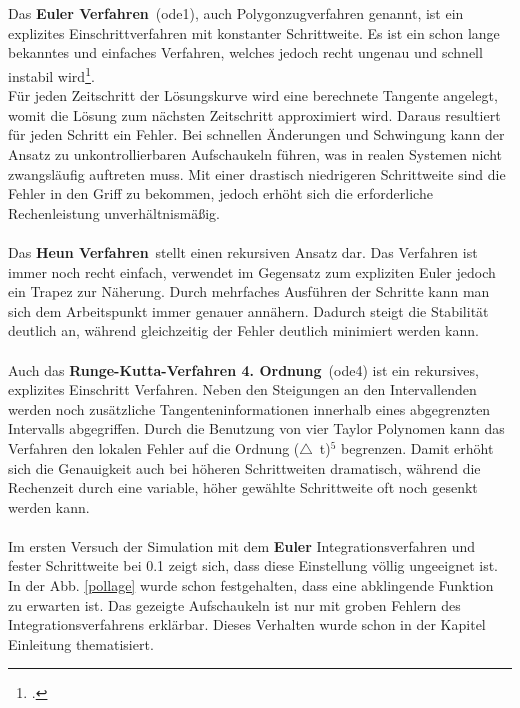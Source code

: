 \documentclass[12pt,a4paper]{scrartcl}	%
\begin{document}
\\
\\
Das \textbf{Euler Verfahren}~(ode1), auch Polygonzugverfahren genannt, ist ein explizites Einschrittverfahren mit konstanter Schrittweite. Es ist ein schon lange bekanntes und einfaches Verfahren, welches jedoch recht ungenau und schnell instabil wird\footcite[vgl.][S. 55 \psq]{simu}.\\
Für jeden Zeitschritt der Lösungskurve wird eine berechnete Tangente angelegt, womit die Lösung zum nächsten Zeitschritt approximiert wird. Daraus resultiert für jeden Schritt ein Fehler. Bei schnellen Änderungen und Schwingung kann der Ansatz zu unkontrollierbaren Aufschaukeln führen, was in realen Systemen nicht zwangsläufig auftreten muss. Mit einer drastisch niedrigeren Schrittweite sind die Fehler in den Griff zu bekommen, jedoch erhöht sich die erforderliche Rechenleistung unverhältnismäßig.\\
\\
Das \textbf{Heun Verfahren}~stellt einen rekursiven Ansatz dar. Das Verfahren ist immer noch recht einfach, verwendet im Gegensatz zum expliziten Euler jedoch ein Trapez zur Näherung. Durch mehrfaches Ausführen der Schritte kann man sich dem Arbeitspunkt immer genauer annähern. Dadurch steigt die Stabilität deutlich an, während gleichzeitig der Fehler deutlich minimiert werden kann.\\
\\
Auch das \textbf{Runge-Kutta-Verfahren 4. Ordnung}~(ode4) ist ein rekursives, explizites Einschritt Verfahren. Neben den Steigungen an den Intervallenden werden noch zusätzliche Tangenteninformationen innerhalb eines abgegrenzten Intervalls abgegriffen. Durch die Benutzung von vier Taylor Polynomen kann das Verfahren den lokalen Fehler auf die Ordnung ($\triangle$~t)$^{5}$ begrenzen. Damit erhöht sich die Genauigkeit auch bei höheren Schrittweiten dramatisch, während die Rechenzeit durch eine variable, höher gewählte Schrittweite oft noch gesenkt werden kann.\\
\\
Im ersten Versuch der Simulation mit dem \textbf{Euler} Integrationsverfahren und fester Schrittweite bei 0.1 zeigt sich, dass diese Einstellung völlig ungeeignet ist. In der Abb. \ref{pollage} wurde schon festgehalten, dass eine abklingende Funktion zu erwarten ist. Das gezeigte Aufschaukeln ist nur mit groben Fehlern des Integrationsverfahrens erklärbar. Dieses Verhalten wurde schon in der Kapitel Einleitung thematisiert.
\begin{figure} [htb]
\end{figure}
\end{document}
